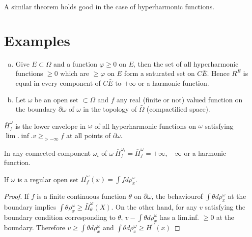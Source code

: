 A similar theorem holds good in the case of hyperharmonic functions.
 
\section{Examples}\label{p4:chap4:sec15}

\begin{enumerate}[a)]
\item Give $E \subset \Omega$ and a function $\varphi \ge 0$ on $E$,
  then the set of all hyperharmonic functions $\ge 0$ which are $\ge
  \varphi$ on $E$ form a saturated set on $C \bar{E}$. Hence $R^E$ is
  equal in every component of $C \bar{E}$ to $+ \infty$ or a harmonic
  function. 
\item Let $\omega$ be an open set $\subset \Omega$ and $f$ any real
  (finite or not) valued function on the boundary $\partial \omega$ of
  $\omega$ in the topology of $\bar{\Omega}$ (compactified space). 
\end{enumerate}

\begin{defn}\label{p4:chap4:sec15:def12}%
  $\bar{H}^\omega_f $  is the lower envelope in $\omega$ of all
  hyperharmonic functions on $\omega$ satisfying $\lim. \inf. v \ge_{> -
    \infty}f$ at all points of $\partial \omega$. 
\end{defn}

\setcounter{prop}{3}
\begin{prop}\label{p4:chap4:sec15:prop4} %
  In any connected component $\omega_i$ of $\omega
  ~\bar{H}^{\omega_i}_f = \bar{H}^\omega_f = + \infty$, $- \infty$ or a
  harmonic function. 
\end{prop}

\begin{thm}\label{p4:chap4:sec15:thm9}%
  If $\omega$ is a regular open set $\bar{H}^\omega_f (x) = \int f d
  \rho^\omega_x$. 
\end{thm}

\begin{proof}
  If $f$ is a finite continuous function $\theta$ on $\partial
  \omega$, the behaviour\pageoriginale of $\int \theta d \rho^\omega_x$ at the
  boundary implies $\int \theta \rho^\omega_x \ge
  \bar{H}^\omega_\theta (X)$. On the other hand, for any $v$
  satisfying the boundary condition corresponding to $\theta$, $v- \int
  \theta d \rho^\omega_x$ has a lim.inf. $\ge 0$ at the
  boundary. Therefore $v \ge \int \theta d \rho^\omega_x$ and $\int
  \theta d \rho^\omega_x \ge \bar{H}^\omega (x)$ 
\end{proof}

